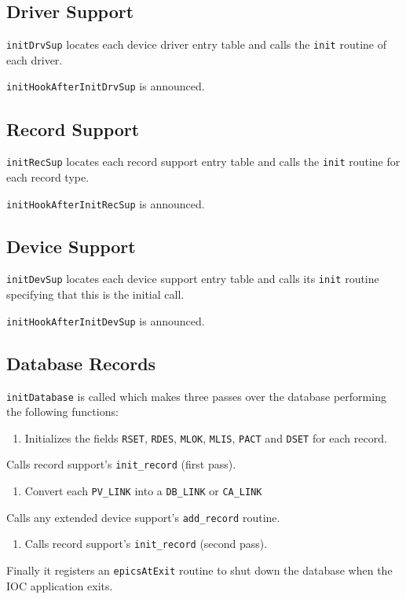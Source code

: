 \subsection{Driver Support}

\verb|initDrvSup| locates each device driver entry table and calls the \verb|init| routine of each driver.

\verb|initHookAfterInitDrvSup| is announced.

\subsection{Record Support}

\verb|initRecSup| locates each record support entry table and calls the \verb|init| routine for each record type.

\verb|initHookAfterInitRecSup| is announced.

\subsection{Device Support}

\verb|initDevSup| locates each device support entry table and calls its \verb|init| routine specifying that this is the initial call.

\verb|initHookAfterInitDevSup| is announced.

\subsection{Database Records}

\verb|initDatabase| is called which makes three passes over the database performing the following functions:

\begin{enumerate}\item Initializes the fields \verb|RSET|, \verb|RDES|, \verb|MLOK|, \verb|MLIS|, \verb|PACT| and \verb|DSET| for each record.

\end{enumerate}\begin{description}\item Calls record support's \verb|init_record| (first pass).

\end{description}\begin{enumerate}\item Convert each \verb|PV_LINK| into a \verb|DB_LINK| or \verb|CA_LINK|

\end{enumerate}\begin{description}\item Calls any extended device support's \verb|add_record| routine.

\end{description}\begin{enumerate}\item Calls record support's \verb|init_record| (second pass).

\end{enumerate}Finally it registers an \verb|epicsAtExit| routine to shut down the database when the IOC application exits.


